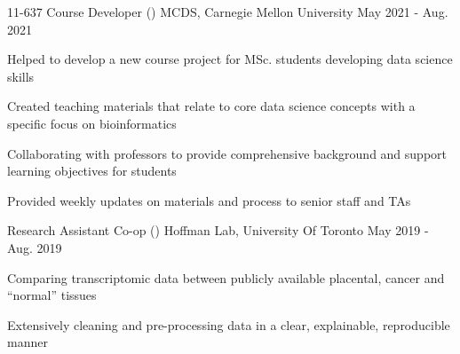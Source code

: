 \begin{cventries}
    \cventry
    {11-637 Course Developer ()}
      {MCDS, Carnegie Mellon University}
      {May 2021 - Aug. 2021}
      {}%
      {
        \begin{cvitems}
        \item {Helped to develop a new course project for MSc. students developing data science skills}
        \item {Created teaching materials that relate to core data science concepts with a specific focus on bioinformatics}
        \item {Collaborating with professors to provide comprehensive background and support learning objectives for students}
        \item {Provided weekly updates on materials and process to senior staff and TAs}
        \end{cvitems}
      }
    \cventry
    {Research Assistant Co-op ()}
      {Hoffman Lab, University Of Toronto}
      {May 2019 - Aug. 2019}
      {}%
      {
        \begin{cvitems}
         \item {Comparing transcriptomic data between publicly available placental, cancer and ``normal'' tissues}
         \item {Extensively cleaning and pre-processing data in a clear, explainable, reproducible manner}

\end{cvitems}}
\end{cventries}
